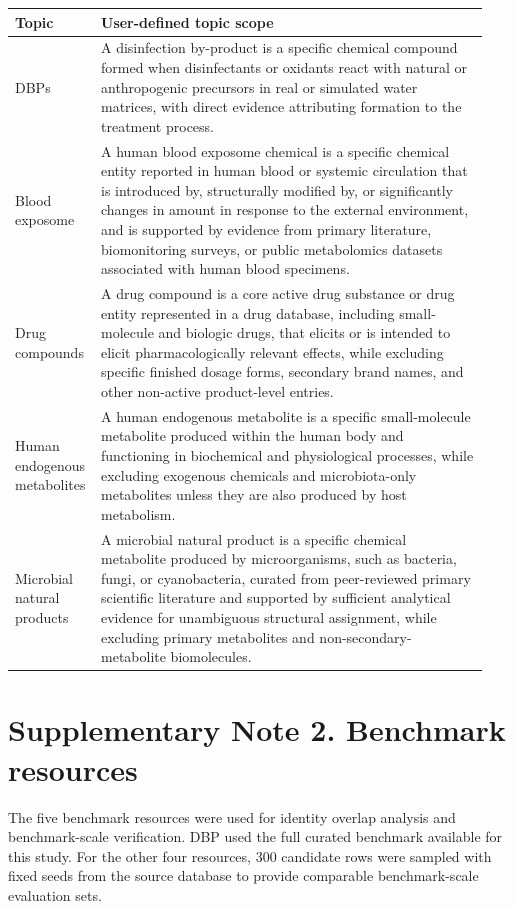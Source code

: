 \documentclass[10pt]{article}
\begin{document}
\begin{longtable}{@{}>{\raggedright\arraybackslash}p{0.14\linewidth}>{\raggedright\arraybackslash}p{0.80\linewidth}@{}}
\toprule
Topic & User-defined topic scope \\
\midrule
DBPs & A disinfection by-product is a specific chemical compound formed when disinfectants or oxidants react with natural or anthropogenic precursors in real or simulated water matrices, with direct evidence attributing formation to the treatment process. \\
Blood exposome & A human blood exposome chemical is a specific chemical entity reported in human blood or systemic circulation that is introduced by, structurally modified by, or significantly changes in amount in response to the external environment, and is supported by evidence from primary literature, biomonitoring surveys, or public metabolomics datasets associated with human blood specimens. \\
Drug compounds & A drug compound is a core active drug substance or drug entity represented in a drug database, including small-molecule and biologic drugs, that elicits or is intended to elicit pharmacologically relevant effects, while excluding specific finished dosage forms, secondary brand names, and other non-active product-level entries. \\
Human endogenous metabolites & A human endogenous metabolite is a specific small-molecule metabolite produced within the human body and functioning in biochemical and physiological processes, while excluding exogenous chemicals and microbiota-only metabolites unless they are also produced by host metabolism. \\
Microbial natural products & A microbial natural product is a specific chemical metabolite produced by microorganisms, such as bacteria, fungi, or cyanobacteria, curated from peer-reviewed primary scientific literature and supported by sufficient analytical evidence for unambiguous structural assignment, while excluding primary metabolites and non-secondary-metabolite biomolecules. \\
\bottomrule
\end{longtable}

\section*{Supplementary Note 2. Benchmark resources}

The five benchmark resources were used for identity overlap analysis and benchmark-scale verification. DBP used the full curated benchmark available for this study. For the other four resources, 300 candidate rows were sampled with fixed seeds from the source database to provide comparable benchmark-scale evaluation sets.
\end{document}
